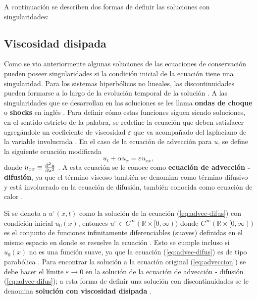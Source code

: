 A continuación se describen dos formas de definir las soluciones con singularidades:
\subsection{Viscosidad disipada}
Como se vio anteriormente algunas soluciones de las ecuaciones de conservación pueden poseer singularidades si la condición inicial de la ecuación tiene una singularidad. Para los sistemas hiperbólicos no lineales, las discontinuidades pueden formarse a lo largo de la evolución temporal de la solución \cite{Leveque}. A las singularidades que se desarrollan en las soluciones se les llama \textbf{ondas de choque} o \textbf{shocks} en inglés \cite{Cameron}. Para definir cómo estas funciones siguen siendo soluciones, en el sentido estricto de la palabra, se redefine la ecuación que deben satisfacer agregándole un coeficiente de viscosidad $\varepsilon$ que va acompañado del laplaciano de la variable involucrada \cite{Leveque}. En el caso de la ecuación de advección para $u$, se define la siguiente ecuación modificada
\begin{equation}
	u_t + \alpha u_x = \varepsilon u_{xx},
	\label{eq:advec-difus}
\end{equation}
donde $u_{xx} \equiv \pdv[2]{u}{x}$ \cite{Leveque}. A esta ecuación se le conoce como \textbf{ecuación de advección - difusión}, ya que el término viscoso también se denomina como término difusivo y está involucrado en la ecuación de difusión, también conocida como ecuación de calor \cite{heattransfer}. 

Si se denota a $u^{\varepsilon}(x,t)$ como la solución de la ecuación (\ref{eq:advec-difus}) con condición inicial $u_0(x)$, entonces $u^{\varepsilon} \in C^{\infty}(\mathbb{R} \times [0,\infty)) $ donde $ C^{\infty}(\mathbb{R}\times [0,\infty))$ es el conjunto de funciones infinitamente diferenciables (suaves) definidas en el mismo espacio en donde se resuelve la ecuación \cite{Leveque}. Esto se cumple incluso si $u_0(x)$ no es una función suave, ya que la ecuación (\ref{eq:advec-difus}) es de tipo parabólica \cite{Leveque}. Para encontrar la solución a la ecuación original (\ref{eq:adveccion}) se debe hacer el límite $\varepsilon \rightarrow 0$ en la solución de la ecuación de advección - difusión (\ref{eq:advec-difus}); a esta forma de definir una solución con discontinuidades se le denomina \textbf{solución con viscosidad disipada} \cite{Leveque}.

